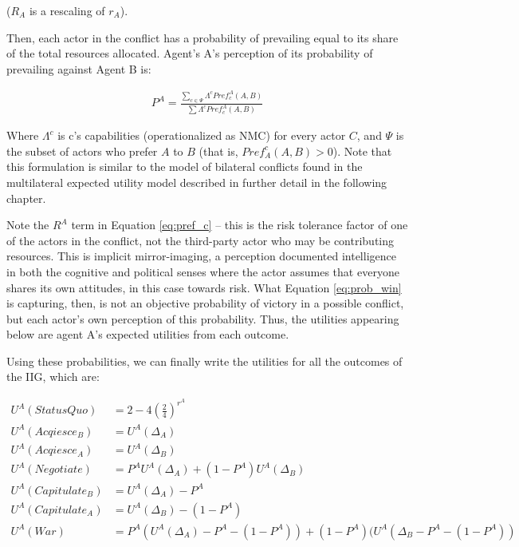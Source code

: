 ($R_A$ is a rescaling of $r_A$). 

Then, each actor in the conflict has a probability of prevailing equal to its share of the total resources allocated. Agent's A's perception of its probability of prevailing against Agent B is:

\begin{align} 
	P^A=\frac{\sum_{c\in\Psi}\Lambda^c Pref^A_c(A,B) }{\sum\Lambda^c Pref^A_c(A,B)} \label{eq:prob_win}
\end{align} 

Where $\Lambda^c$ is c's capabilities (operationalized as NMC) for every actor $C$, and $\Psi$ is the subset of actors who prefer $A$ to $B$ (that is, $Pref_A^c(A,B)>0$). Note that this formulation is similar to the model of bilateral conflicts found in the multilateral expected utility model \citep{bdm_1997,bdm_2002,scholz_2011} described in further detail in the following chapter.

Note the $R^A$ term in Equation \ref{eq:pref_c}  -- this is the risk tolerance factor of one of the actors in the conflict, not the third-party actor who may be contributing resources. This is implicit mirror-imaging, a perception documented intelligence in both the cognitive \citep{meltzoff_2003} and political senses \citep{heuer_2001}  where the actor assumes that everyone shares its own attitudes, in this case towards risk. What Equation \ref{eq:prob_win} is capturing, then, is not an objective probability of victory in a possible conflict, but each actor's own perception of this probability. Thus, the utilities appearing below are agent A's expected utilities from each outcome.

Using these probabilities, we can finally write the utilities for all the outcomes of the IIG, which are:

\begin{align} 
	U^A(StatusQuo) &= 2-4(\frac{2}{4})^{r^A} \\ 	
	U^A(Acqiesce_B) &= U^A(\Delta_A) \\ 
	U^A(Acqiesce_A) &= U^A(\Delta_B) \\ 
	U^A(Negotiate) &= P^AU^A(\Delta_A) + (1-P^A)U^A(\Delta_B) \\ 
	U^A(Capitulate_B) &= U^A(\Delta_A)-P^A \\
	U^A(Capitulate_A) &= U^A(\Delta_B)-(1-P^A) \\
	U^A(War) &= P^A(U^A(\Delta_A) - P^A - (1-P^A)) + (1-P^A)(U^A(\Delta_B - P^A - (1-P^A)) 
\end{align}

